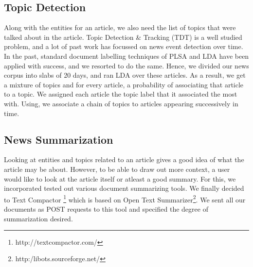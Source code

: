 \documentclass{acm_proc_article-sp}
\begin{document}
\subsection{Topic Detection}
Along with the entities for an article, we also need the list of topics that were talked about in the article. Topic Detection \& Tracking (TDT) is a well studied problem\cite{springerlink:10.1023/B:INRT.0000011210.12953.86, springerlink:10.1007}, and a lot of past work has focussed on news event detection over time\cite{Mei:2005:DET:1081870.1081895, Kim:2011:TCU:1964750.1964765}. In the past, standard document labelling techniques of PLSA\cite{Hofmann99probabilisticlatent} and LDA\cite{Blei:2003:LDA:944919.944937} have been applied with success, and we resorted to do the same. Hence, we divided our news corpus into slabs of 20 days, and ran LDA over these articles. As a result, we get a mixture of topics and for every article, a probability of associating that article to a topic. We assigned each article the topic label that it associated the most with. Using, we associate a chain of topics to articles appearing successively in time.

\subsection{News Summarization}
Looking at entities and topics related to an article gives a good idea of what the article may be about. However, to be able to draw out more context, a user would like to look at the article itself or atleast a good summary. For this, we incorporated tested out various document summarizing tools. We finally decided to Text Compactor \footnote{http://textcompactor.com/} which is based on Open Text Summarizer\footnote{http:/libots.sourceforge.net/}. We sent all our documents as POST requests to this tool and specified the degree of summarization desired.
\end{document}
